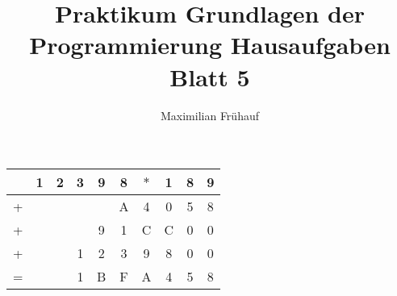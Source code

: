 \documentclass[a4paper, 10pt]{article}
\title{Praktikum Grundlagen der Programmierung Hausaufgaben Blatt 5}
\author{Maximilian Frühauf}
\begin{document}
\maketitle

\begin{tabular}{cccccccccc}
	  & 1 & 2 & 3 & 9 & 8 & $\ast$ & 1 & 8 & 9 \\
	\hline
	+ &   &   &   &   & A & 4      & 0 & 5 & 8 \\
	+ &   &   &   & 9 & 1 & C      & C & 0 & 0 \\
	+ &   &   & 1 & 2 & 3 & 9      & 8 & 0 & 0 \\
	\hline
	= &   &   & 1 & B & F & A      & 4 & 5 & 8 \\
\end{tabular}
\end{document}
